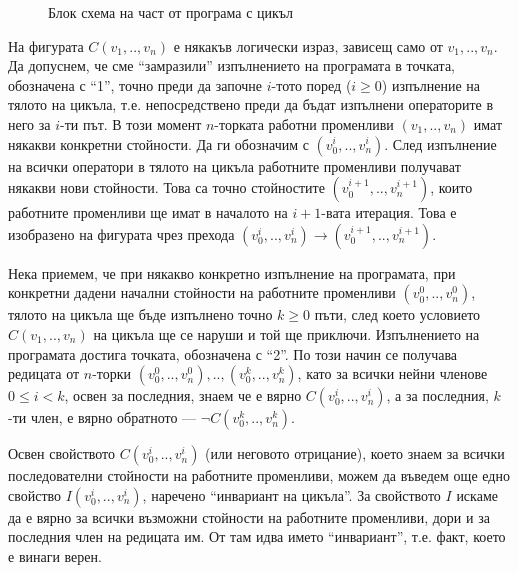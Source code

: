 {\begin{figure}

  \caption{Блок схема на част от програма с  цикъл}
  \label{fig:1while}
\end{figure}


\begin{mdframed}[hidealllines=true,backgroundcolor=gray!20]
На фигурата $C(v_1,..,v_n)$ е някакъв логически израз, зависещ само от $v_1,..,v_n$. Да допуснем, че сме ``замразили'' изпълнението на програмата в точката, обозначена с ``1'', точно преди да започне $i$-тото поред ($i\geq 0$) изпълнение на тялото на цикъла, т.е. непосредствено преди да бъдат изпълнени операторите в него за $i$-ти път. В този момент $n$-торката работни променливи $(v_1,..,v_n)$ имат някакви конкретни стойности. Да ги обозначим с $(v_0^{i},..,v_n^{i})$. След изпълнение на всички оператори в тялото на цикъла работните променливи получават някакви нови стойности. Това са точно стойностите $(v_0^{i+1},..,v_n^{i+1})$, които работните променливи ще имат в началото на $i+1$-вата итерация. Това е изобразено на фигурата чрез прехода $(v_0^i,..,v_n^i) \rightarrow (v_0^{i+1},..,v_n^{i+1})$.

Нека приемем, че при някакво конкретно изпълнение на програмата, при конкретни дадени начални стойности на работните променливи  $(v_0^{0},..,v_n^{0})$, тялото на цикъла ще бъде изпълнено точно  $k\geq 0$ пъти, след което условието $C(v_1,..,v_n)$ на цикъла ще се наруши и той ще приключи. Изпълнението на програмата достига точката, обозначена с ``2''. По този начин се получава редицата от $n$-торки $(v_0^{0},..,v_n^{0}),..,(v_0^{k},..,v_n^{k})$, като за всички нейни членове $0\leq i < k$, освен за последния, знаем че е вярно $C(v_0^{i},..,v_n^{i})$, а за последния, $k$-ти член, е вярно обратното --- $\neg C(v_0^{k},..,v_n^{k})$.

Освен свойството $C(v_0^{i},..,v_n^{i})$ (или неговото отрицание), което знаем за всички последователни стойности на работните променливи, можем да въведем още едно свойство $I(v_0^{i},..,v_n^{i})$, наречено ``инвариант на цикъла''. За свойството $I$ искаме да е вярно за всички възможни стойности на работните променливи, дори и за последния член на редицата им. От там идва името ``инвариант'', т.е. факт, което е винаги верен.


\end{mdframed}}
